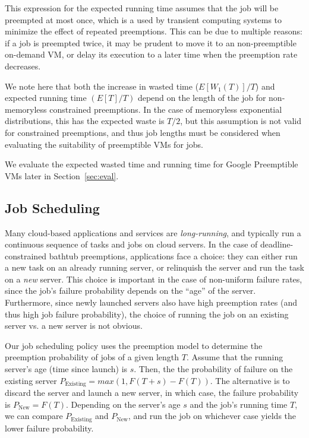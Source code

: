 This expression for the expected running time assumes that the job will be preempted at most once, which is a used by transient computing systems to minimize the effect of repeated preemptions. 
This can be due to multiple reasons: if a job is preempted twice, it may be prudent to move it to an non-preemptible on-demand VM, or delay its execution to a later time when the preemption rate decreases.

We note here that both the increase in wasted time ($E[W_1(T)]/T$) and expected running time $(E[T]/T)$ depend on the length of the job for non-memoryless constrained preemptions.
In the case of memoryless exponential distributions, this has the expected waste is $T/2$, but this assumption is not valid for constrained preemptions, and thus job lengths must be considered when evaluating the suitability of preemptible VMs for jobs. 

We evaluate the expected wasted time and running time for Google Preemptible VMs later in Section~\ref{sec:eval}. 

\subsection{Job Scheduling}

Many cloud-based applications and services are \emph{long-running}, and typically run a continuous sequence of tasks and jobs on cloud servers. 
In the case of deadline-constrained bathtub preemptions, applications face a choice: they can either run a new task on an already running server, or relinquish the server and run the task on a \emph{new} server. 
This choice is important in the case of non-uniform failure rates, since the job's failure probability depends on the ``age'' of the server.
Furthermore, since newly launched servers also have high preemption rates (and thus high job failure probability), the choice of running the job on an existing server vs. a new server is not obvious.


Our job scheduling policy uses the preemption model to determine the preemption probability of jobs of a given length $T$. 
Assume that the running server's age (time since launch) is $s$. 
Then, the the probability of failure on the existing server $P_{\text{Existing}} = max(1, F(T+s) - F(T))$.
The alternative is to discard the server and launch a new server, in which case, the failure probability is $P_{\text{New}} = F(T)$.
Depending on the server's age $s$ and the job's running time $T$, we can compare $P_{\text{Existing}}$ and $P_{\text{New}}$, and run the job on whichever case yields the lower failure probability.

